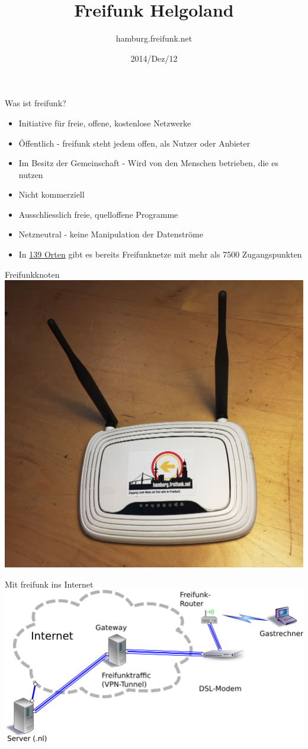 \documentclass[c]{beamer}
\title{Freifunk Helgoland}
\author{hamburg.freifunk.net}
\date{2014/Dez/12}
\begin{document}
\maketitle

\begin{frame}{Was ist freifunk?}
	\begin{itemize}
		\item Initiative für freie, offene, kostenlose Netzwerke
		\item Öffentlich - freifunk steht jedem offen, als Nutzer oder Anbieter
		\item Im Besitz der Gemeinschaft - Wird von den Menschen betrieben, die es nutzen
		\item Nicht kommerziell
		\item Ausschliesslich freie, quelloffene Programme
		\item Netzneutral - keine Manipulation der Datenströme
		\item In  \href{http://freifunk.net/wie-mache-ich-mit/community-finden/}{139 Orten} gibt es bereits Freifunknetze mit mehr als 7500 Zugangspunkten
	\end{itemize}
\end{frame}

\begin{frame}{Freifunkknoten}
	\includegraphics[width=.6\textwidth]{Bilder/841}
\end{frame}


\begin{frame}{Mit freifunk ins Internet}
	\includegraphics[width=\textwidth]{Bilder/Freifunk_Knotenanbindung}
\end{frame}
\end{document}
